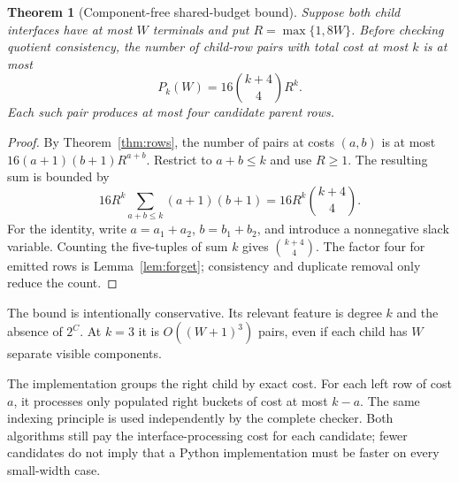 \documentclass[11pt,letterpaper]{article}
\newtheorem{theorem}{Theorem}[section]
\theoremstyle{definition}
\theoremstyle{remark}\newtheorem{remark}[theorem]{Remark}
\begin{document}
\begin{theorem}[Component-free shared-budget bound]\label{thm:pairs}
Suppose both child interfaces have at most $W$ terminals and put $R=\max\{1,8W\}$. Before checking quotient consistency, the number of child-row pairs with total cost at most $k$ is at most
\begin{equation}\label{eq:pairs}
 P_k(W)=16\binom{k+4}{4}R^k.
\end{equation}
Each such pair produces at most four candidate parent rows.
\end{theorem}
\begin{proof}
By Theorem~\ref{thm:rows}, the number of pairs at costs $(a,b)$ is at most $16(a+1)(b+1)R^{a+b}$. Restrict to $a+b\le k$ and use $R\ge1$. The resulting sum is bounded by
\[
 16R^k\sum_{a+b\le k}(a+1)(b+1)
 =16R^k\binom{k+4}{4}.
\]
For the identity, write $a=a_1+a_2$, $b=b_1+b_2$, and introduce a nonnegative slack variable. Counting the five-tuples of sum $k$ gives $\binom{k+4}{4}$. The factor four for emitted rows is Lemma~\ref{lem:forget}; consistency and duplicate removal only reduce the count.
\end{proof}
The bound is intentionally conservative. Its relevant feature is degree $k$ and the absence of $2^C$. At $k=3$ it is $O((W+1)^3)$ pairs, even if each child has $W$ separate visible components.

The implementation groups the right child by exact cost. For each left row of cost $a$, it processes only populated right buckets of cost at most $k-a$. The same indexing principle is used independently by the complete checker. Both algorithms still pay the interface-processing cost for each candidate; fewer candidates do not imply that a Python implementation must be faster on every small-width case.
\end{document}
